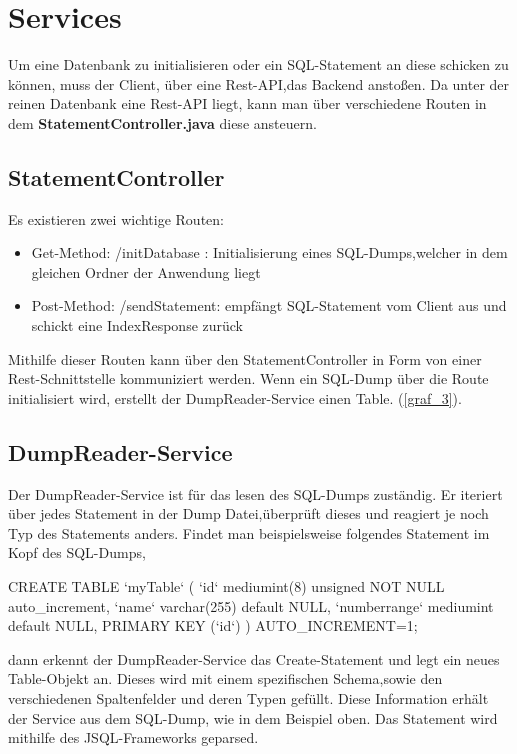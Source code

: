 \section{Services}
Um eine Datenbank zu initialisieren oder ein SQL-Statement an diese schicken zu können, muss der Client, über eine Rest-API,das Backend anstoßen.
Da unter der reinen Datenbank eine Rest-API liegt, kann man über verschiedene Routen in dem \textbf{StatementController.java} diese ansteuern.


\subsection{StatementController}
Es existieren zwei wichtige Routen:

\begin{itemize}
 \item Get-Method: /initDatabase : Initialisierung eines SQL-Dumps,welcher in dem gleichen Ordner der Anwendung liegt
 \item Post-Method: /sendStatement: empfängt SQL-Statement vom Client aus und schickt eine IndexResponse zurück
\end{itemize}

Mithilfe dieser Routen kann über den StatementController in Form von einer Rest-Schnittstelle kommuniziert werden.
Wenn ein SQL-Dump über die Route initialisiert wird, erstellt der DumpReader-Service einen Table. (\ref{graf_3}). 


\subsection{DumpReader-Service}
Der DumpReader-Service ist für das lesen des SQL-Dumps zuständig. Er iteriert über jedes Statement in der Dump Datei,überprüft dieses und reagiert je noch Typ des Statements anders.
Findet man beispielsweise folgendes Statement im Kopf des SQL-Dumps,
\\

\begin{terminalblock}
  \begin{textcode}
CREATE TABLE `myTable` (
  `id` mediumint(8) unsigned NOT NULL auto_increment,
  `name` varchar(255) default NULL,
  `numberrange` mediumint default NULL,
  PRIMARY KEY (`id`)
) AUTO_INCREMENT=1;
  \end{textcode}
\end{terminalblock}

dann erkennt der DumpReader-Service das Create-Statement und legt ein neues Table-Objekt an. Dieses wird mit einem spezifischen Schema,sowie den verschiedenen Spaltenfelder und deren Typen gefüllt.
Diese Information erhält der Service aus dem SQL-Dump, wie in dem Beispiel oben.
Das Statement wird mithilfe des JSQL-Frameworks geparsed. \\

